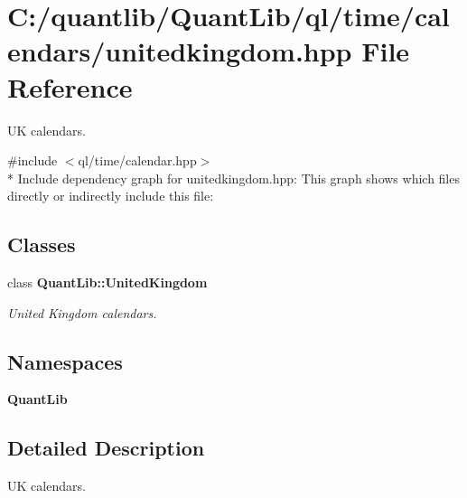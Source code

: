\section{C\+:/quantlib/\+Quant\+Lib/ql/time/calendars/unitedkingdom.hpp File Reference}
\label{unitedkingdom_8hpp}


UK calendars.  


{\ttfamily \#include $<$ql/time/calendar.\+hpp$>$}\\*
Include dependency graph for unitedkingdom.\+hpp\+:
This graph shows which files directly or indirectly include this file\+:
\subsection*{Classes}
\begin{DoxyCompactItemize}
\item 
class {\bf Quant\+Lib\+::\+United\+Kingdom}
\begin{DoxyCompactList}\small\item\em United Kingdom calendars. \end{DoxyCompactList}\end{DoxyCompactItemize}
\subsection*{Namespaces}
\begin{DoxyCompactItemize}
\item 
 {\bf Quant\+Lib}
\end{DoxyCompactItemize}


\subsection{Detailed Description}
UK calendars. 

